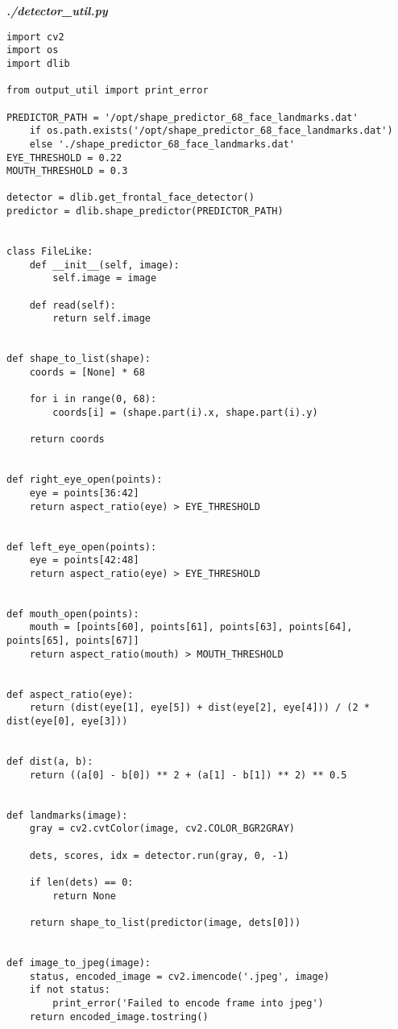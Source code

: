 \textit{\textbf{./detector\_util.py}}
\begin{verbatim}
import cv2
import os
import dlib

from output_util import print_error

PREDICTOR_PATH = '/opt/shape_predictor_68_face_landmarks.dat' 
    if os.path.exists('/opt/shape_predictor_68_face_landmarks.dat') 
    else './shape_predictor_68_face_landmarks.dat'
EYE_THRESHOLD = 0.22
MOUTH_THRESHOLD = 0.3

detector = dlib.get_frontal_face_detector()
predictor = dlib.shape_predictor(PREDICTOR_PATH)


class FileLike:
    def __init__(self, image):
        self.image = image

    def read(self):
        return self.image


def shape_to_list(shape):
    coords = [None] * 68

    for i in range(0, 68):
        coords[i] = (shape.part(i).x, shape.part(i).y)

    return coords


def right_eye_open(points):
    eye = points[36:42]
    return aspect_ratio(eye) > EYE_THRESHOLD


def left_eye_open(points):
    eye = points[42:48]
    return aspect_ratio(eye) > EYE_THRESHOLD


def mouth_open(points):
    mouth = [points[60], points[61], points[63], points[64], points[65], points[67]]
    return aspect_ratio(mouth) > MOUTH_THRESHOLD


def aspect_ratio(eye):
    return (dist(eye[1], eye[5]) + dist(eye[2], eye[4])) / (2 * dist(eye[0], eye[3]))


def dist(a, b):
    return ((a[0] - b[0]) ** 2 + (a[1] - b[1]) ** 2) ** 0.5


def landmarks(image):
    gray = cv2.cvtColor(image, cv2.COLOR_BGR2GRAY)

    dets, scores, idx = detector.run(gray, 0, -1)

    if len(dets) == 0:
        return None

    return shape_to_list(predictor(image, dets[0]))


def image_to_jpeg(image):
    status, encoded_image = cv2.imencode('.jpeg', image)
    if not status:
        print_error('Failed to encode frame into jpeg')
    return encoded_image.tostring()

\end{verbatim}


